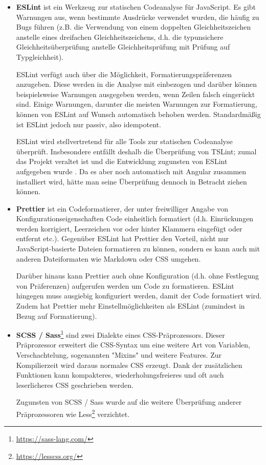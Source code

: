 \begin{itemize}
\item \textbf{ESLint} ist ein Werkzeug zur statischen Codeanalyse für JavaScript. Es gibt Warnungen aus, wenn bestimmte Ausdrücke verwendet wurden, die häufig zu Bugs führen (z.B. die Verwendung von einem doppelten Gleichheitszeichen anstelle eines dreifachen Gleichheitszeichens, d.h. die typunsichere Gleichheitsüberprüfung anstelle Gleichheitsprüfung mit Prüfung auf Typgleichheit).

ESLint verfügt auch über die Möglichkeit, Formatierungspräferenzen anzugeben. Diese werden in die Analyse mit einbezogen und darüber können beispielsweise Warnungen ausgegeben werden, wenn Zeilen falsch eingerückt sind. Einige Warnungen, darunter die meisten Warnungen zur Formatierung, können von ESLint auf Wunsch automatisch behoben werden. Standardmäßig ist ESLint jedoch nur passiv, also idempotent.

ESLint wird stellvertretend für alle Tools zur statischen Codeanalyse überprüft. Insbesondere entfällt deshalb die Überprüfung von TSLint; zumal das Projekt veraltet ist und die Entwicklung zugunsten von ESLint aufgegeben wurde \cite{tslint_deprecation} \cite{tslint_repo}. Da es aber noch automatisch mit Angular zusammen installiert wird, hätte man seine Überprüfung dennoch in Betracht ziehen können.

\item \textbf{Prettier} ist ein Codeformatierer, der unter freiwilliger Angabe von Konfigurationseigenschaften Code einheitlich formatiert (d.h. Einrückungen werden korrigiert, Leerzeichen vor oder hinter Klammern eingefügt oder entfernt etc.). Gegenüber ESLint hat Prettier den Vorteil, nicht nur JavaScript-basierte Dateien formatieren zu können, sondern es kann auch mit anderen Dateiformaten wie Markdown oder CSS umgehen.

Darüber hinaus kann Prettier auch ohne Konfiguration (d.h. ohne Festlegung von Präferenzen) aufgerufen werden um Code zu formatieren. ESLint hingegen muss ausgiebig konfiguriert werden, damit der Code formatiert wird. Zudem hat Prettier mehr Einstellmöglichkeiten als ESLint (zumindest in Bezug auf Formatierung).

\item \textbf{SCSS / Sass}\footnote{\url{https://sass-lang.com/}} sind zwei Dialekte eines CSS-Präprozessors. Dieser Präprozessor erweitert die CSS-Syntax um eine weitere Art von Variablen, Verschachtelung, sogenannten "Mixins" und weitere Features. Zur Kompilierzeit wird daraus normales CSS erzeugt. Dank der zusätzlichen Funktionen kann kompakteres, wiederholungsfreieres und oft auch leserlicheres CSS geschrieben werden.

Zugunsten von SCSS / Sass wurde auf die weitere Überprüfung anderer Präprozessoren wie Less\footnote{\url{https://lesscss.org/}} verzichtet.
\end{itemize}

